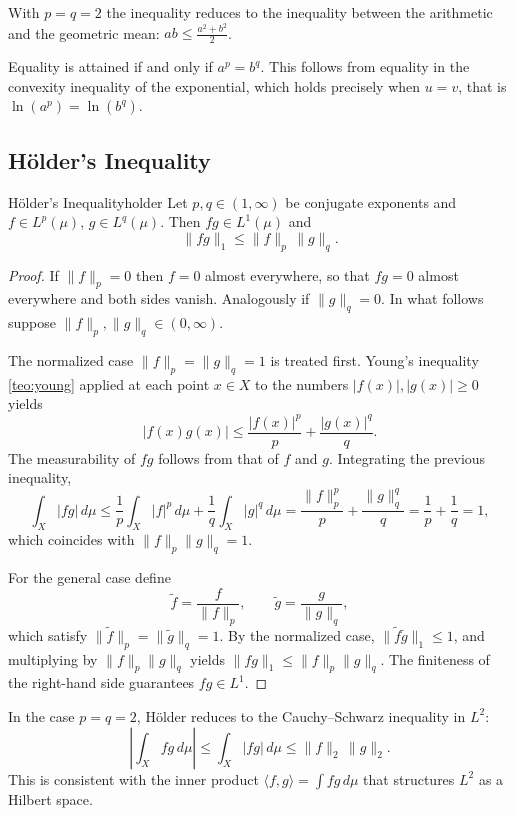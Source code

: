 \documentclass[11pt, a4paper]{article}
\begin{document}
\obs With $p = q = 2$ the inequality reduces to the inequality between the arithmetic and the
geometric mean: $ab \le \tfrac{a^2 + b^2}{2}$.

\obs Equality is attained if and only if $a^p = b^q$. This follows from equality in the
convexity inequality of the exponential, which holds precisely when $u = v$, that is
$\ln(a^p) = \ln(b^q)$.

\subsection{Hölder's Inequality}

\begin{teorema}{Hölder's Inequality}{holder}
Let $p, q \in (1, \infty)$ be conjugate exponents and $f \in L^p(\mu)$, $g \in L^q(\mu)$. Then
$fg \in L^1(\mu)$ and
$$ \|fg\|_1 \le \|f\|_p \, \|g\|_q. $$
\end{teorema}

\begin{proof}
If $\|f\|_p = 0$ then $f = 0$ almost everywhere, so that $fg = 0$ almost everywhere and
both sides vanish. Analogously if $\|g\|_q = 0$. In what follows suppose
$\|f\|_p, \|g\|_q \in (0, \infty)$.

The normalized case $\|f\|_p = \|g\|_q = 1$ is treated first. Young's inequality
\ref{teo:young} applied
at each point $x \in X$ to the numbers $|f(x)|, |g(x)| \ge 0$ yields
$$ |f(x) g(x)| \le \frac{|f(x)|^p}{p} + \frac{|g(x)|^q}{q}. $$
The measurability of $fg$ follows from that of $f$ and $g$. Integrating the previous inequality,
$$ \int_X |fg| \, d\mu \le \frac{1}{p} \int_X |f|^p \, d\mu + \frac{1}{q} \int_X |g|^q \, d\mu
= \frac{\|f\|_p^p}{p} + \frac{\|g\|_q^q}{q} = \frac{1}{p} + \frac{1}{q} = 1, $$
which coincides with $\|f\|_p \|g\|_q = 1$.

For the general case define
$$ \widetilde{f} = \frac{f}{\|f\|_p}, \qquad \widetilde{g} = \frac{g}{\|g\|_q}, $$
which satisfy $\|\widetilde{f}\|_p = \|\widetilde{g}\|_q = 1$. By the normalized case,
$\|\widetilde{f} \widetilde{g}\|_1 \le 1$, and multiplying by $\|f\|_p \|g\|_q$ yields
$\|fg\|_1 \le \|f\|_p \|g\|_q$. The finiteness of the right-hand side guarantees $fg \in L^1$.
\end{proof}

\obs In the case $p = q = 2$, H\"older reduces to the Cauchy--Schwarz inequality in $L^2$:
$$ \left| \int_X fg \, d\mu \right| \le \int_X |fg| \, d\mu \le \|f\|_2 \, \|g\|_2. $$
This is consistent with the inner product $\langle f, g \rangle = \int fg \, d\mu$ that structures
$L^2$ as a Hilbert space.
\end{document}
